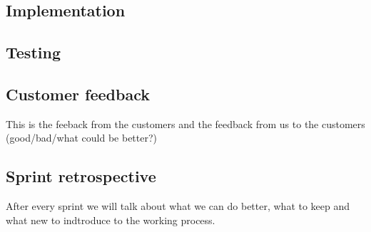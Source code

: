 \subsection{Implementation}

\subsection{Testing}

\subsection{Customer feedback}
	This is the feeback from the customers and the feedback from us to the customers (good/bad/what could be better?)

\subsection{Sprint retrospective}
	After every sprint we will talk about what we can do better, what to keep and what new to indtroduce to the working process.